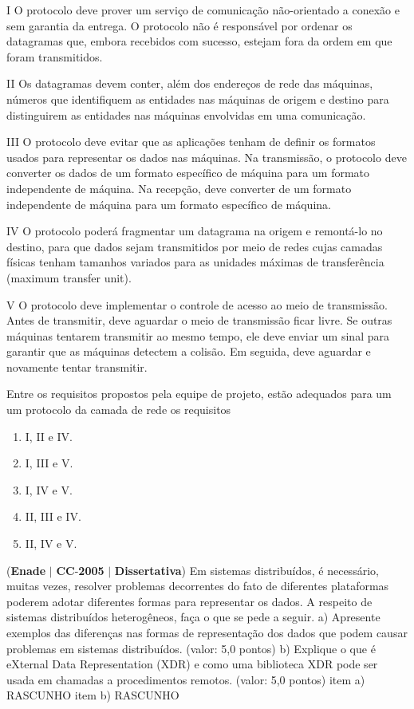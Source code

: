 \documentclass{exam}
\begin{document}
\begin{questions}
I O protocolo deve prover um serviço de comunicação não-orientado a conexão e sem garantia da entrega. O protocolo não é
responsável por ordenar os datagramas que, embora recebidos com sucesso, estejam fora da ordem em que foram transmitidos.

II Os datagramas devem conter, além dos endereços de rede das máquinas, números que identifiquem as entidades nas máquinas de
origem e destino para distinguirem as entidades nas máquinas envolvidas em uma comunicação.

III O protocolo deve evitar que as aplicações tenham de definir os formatos usados para representar os dados nas máquinas. Na
transmissão, o protocolo deve converter os dados de um formato específico de máquina para um formato independente de máquina.
Na recepção, deve converter de um formato independente de máquina para um formato específico de máquina.

IV O protocolo poderá fragmentar um datagrama na origem e remontá-lo no destino, para que dados sejam transmitidos por meio de
redes cujas camadas físicas tenham tamanhos variados para as unidades máximas de transferência (maximum transfer unit).

V O protocolo deve implementar o controle de acesso ao meio de transmissão. Antes de transmitir, deve aguardar o meio de
transmissão ficar livre. Se outras máquinas tentarem transmitir ao mesmo tempo, ele deve enviar um sinal para garantir que as
máquinas detectem a colisão. Em seguida, deve aguardar e novamente tentar transmitir.

Entre os requisitos propostos pela equipe de projeto, estão adequados para um um protocolo da camada de rede os requisitos
	\begin{enumerate}[label=\alph*)]
		\item  I, II e IV. 
		\item  I, III e V. 
		\item  I, IV e V. 
		\item  II, III e IV. 
		\item  II, IV e V.
	\end{enumerate}

\question (\textbf{Enade} $|$ \textbf{CC}-\textbf{2005} $|$ \textbf{Dissertativa})
Em sistemas distribuídos, é necessário, muitas vezes, resolver problemas decorrentes do fato de diferentes plataformas
poderem adotar diferentes formas para representar os dados.
A respeito de sistemas distribuídos heterogêneos, faça o que se pede a seguir.
a) Apresente exemplos das diferenças nas formas de representação dos dados que podem causar problemas em sistemas distribuídos.
(valor: 5,0 pontos)
b) Explique o que é eXternal Data Representation (XDR) e como uma biblioteca XDR pode ser usada em chamadas a procedimentos
remotos. (valor: 5,0 pontos)
item a) RASCUNHO
item b) RASCUNHO


\end{questions}
\end{document}
